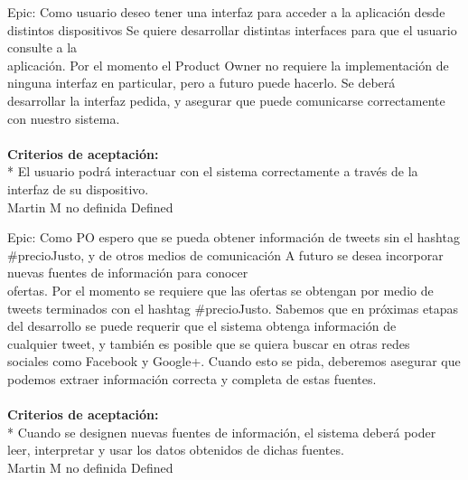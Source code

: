 	{Epic: Como usuario deseo tener una interfaz para acceder a la aplicación desde distintos dispositivos} %
	{Se quiere desarrollar distintas interfaces para que el usuario consulte a la\\
aplicación. Por el momento el Product Owner no requiere la implementación de\\
ninguna interfaz en particular, pero a futuro puede hacerlo. Se deberá\\
desarrollar la interfaz pedida, y asegurar que puede comunicarse correctamente\\
con nuestro sistema.\\
  \\
\textbf{Criterios de aceptación:}\\
* El usuario podrá interactuar con el sistema correctamente a través de la interfaz de su dispositivo.\\
} %
	{} %
	{} %
	{Martin M} %
	{no definida} %
	{Defined} %


\vspace{20pt}

	{Epic: Como PO espero que se pueda obtener información de tweets sin el hashtag \#precioJusto, y de otros medios de comunicación} %
	{A futuro se desea incorporar nuevas fuentes de información para conocer\\
ofertas. Por el momento se requiere que las ofertas se obtengan por medio de\\
tweets terminados con el hashtag \#precioJusto. Sabemos que en próximas etapas\\
del desarrollo se puede requerir que el sistema obtenga información de\\
cualquier tweet, y también es posible que se quiera buscar en otras redes\\
sociales como Facebook y Google+. Cuando esto se pida, deberemos asegurar que\\
podemos extraer información correcta y completa de estas fuentes.\\
  \\
\textbf{Criterios de aceptación:}\\
* Cuando se designen nuevas fuentes de información, el sistema deberá poder leer, interpretar y usar los datos obtenidos de dichas fuentes.\\
} %
	{} %
	{} %
	{Martin M} %
	{no definida} %
	{Defined} %


